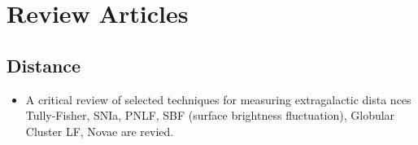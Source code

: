 \section{Review Articles}
\subsection{Distance}
\begin{itemize}
\item A critical review of selected techniques for measuring extragalactic dista
nces \citep[][\#391, 5/26/2010]{jacoby92a}\\
Tully-Fisher, SNIa, PNLF, SBF (surface brightness fluctuation), 
Globular Cluster LF, Novae are revied.
\end{itemize}
